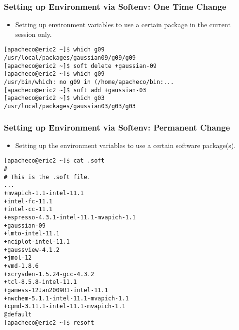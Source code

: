 \documentclass[slidestop,mathserif,compress,xcolor=svgnames,table]{beamer}
\newcommand*\vardiamond{\textcolor{tigerspurple}{%
  \ensuremath{\blacklozenge}}}
\begin{document}
\begin{frame}[fragile]
\frametitle{\small Setting up Environment via Softenv: One Time Change}
\begin{itemize}
\item Setting up environment variables to use a certain package in the current session only.
\end{itemize}
{\tiny
\begin{alertblock}{}
\begin{verbatim}
[apacheco@eric2 ~]$ which g09
/usr/local/packages/gaussian09/g09/g09
[apacheco@eric2 ~]$ soft delete +gaussian-09
[apacheco@eric2 ~]$ which g09
/usr/bin/which: no g09 in (/home/apacheco/bin:...
[apacheco@eric2 ~]$ soft add +gaussian-03
[apacheco@eric2 ~]$ which g03
/usr/local/packages/gaussian03/g03/g03
\end{verbatim}
\end{alertblock}
}
\end{frame}

\begin{frame}[fragile]
\frametitle{\small Setting up Environment via Softenv: Permanent Change}
\begin{itemize}
\item Setting up the environment variables to use a certain software package(s).
\end{itemize}
{\tiny
\begin{alertblock}{}
\begin{verbatim}
[apacheco@eric2 ~]$ cat .soft
#   
# This is the .soft file.
...
+mvapich-1.1-intel-11.1
+intel-fc-11.1
+intel-cc-11.1
+espresso-4.3.1-intel-11.1-mvapich-1.1
+gaussian-09
+lmto-intel-11.1
+nciplot-intel-11.1
+gaussview-4.1.2
+jmol-12
+vmd-1.8.6
+xcrysden-1.5.24-gcc-4.3.2
+tcl-8.5.8-intel-11.1
+gamess-12Jan2009R1-intel-11.1
+nwchem-5.1.1-intel-11.1-mvapich-1.1
+cpmd-3.11.1-intel-11.1-mvapich-1.1
@default
[apacheco@eric2 ~]$ resoft
\end{verbatim}
\end{alertblock}
}
\end{frame}
\end{document}
